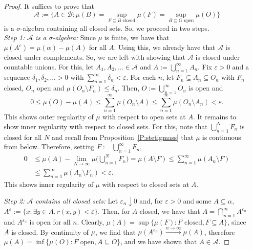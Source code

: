 \documentclass[lean]{DraftAFM}
\begin{document}
\begin{proof}
  It suffices to prove that
  $$ \mathcal A := \Big\{A \in \mathcal B : \mu(B) = \sup_{F\subseteq
    B \text{ closed}} \mu(F) = \sup_{B\subseteq O \text{ open}}
  \mu(O)\Big\} $$ is a $\sigma$-algebra containing all closed
  sets. So, we proceed in two steps.  \\ {\em Step 1: $\mathcal A$ is
    a $\sigma$-algebra:} Since $\mu$ is finite, we have that $\mu(A^c)
  = \mu(\alpha) - \mu(A)$ for all $A$. Using this, we already have
  that $\mathcal A$ is closed under complements. So, we are left with
  showing that $\mathcal A$ is closed under countable unions. For
  this, let $A_1, A_2,... \in \mathcal A$ and $A :=
  \bigcup_{n=1}^\infty A_n$. Fix $\varepsilon > 0$ and a sequence
  $\delta_1, \delta_2,... > 0$ with $\sum_{n=1}^\infty \delta_n <
  \varepsilon$. For each $n$, let $F_n \subseteq A_n \subseteq O_n$
  with $F_n$ closed, $O_n$ open and $\mu(O_n \setminus F_n) \leq
  \delta_n$. Then, $O := \bigcup_{n=1}^\infty O_n$ is open and
  $$ 0 \leq \mu(O) - \mu(A) \leq \sum_{n=1}^\infty \mu(O_n \setminus
  A) \leq \sum_{n=1}^\infty \mu(O_n \setminus A_n) < \varepsilon.$$
  This shows outer regularity of $\mu$ with respect to open sets at
  $A$. It remains to show inner regularity with respect to closed
  sets. For this, note that $\bigcup_{n=1}^N F_n$ is closed for all
  $N$ and recall from Proposition~\ref{P:stetigmass} that $\mu$ is
  continuous from below. Therefore, setting $F := \bigcup_{n=1}^\infty
  F_n$,
  \begin{align*}
    0 & \leq \mu(A) - \lim_{N\to\infty} \mu\Big(\bigcup_{n=1}^N
    F_n\Big) = \mu(A \setminus F) \leq \sum_{n=1}^\infty \mu(A_n
    \setminus F) \\ & \leq \sum_{n=1}^\infty \mu(A_n \setminus F_n) <
    \varepsilon.
  \end{align*}
  This shows inner regularity of $\mu$ with respect to closed sets at
  $A$.


  \noindent
  {\em Step 2: $\mathcal A$ contains all closed sets:} Let
  $\varepsilon_ n\downarrow 0$ and, for $\varepsilon>0$ and some $A
  \subseteq \alpha$, $A^\varepsilon := \{x : \exists y \in A,
  r(x,y)<\varepsilon\}$. Then, for $A$ closed, we have that $A =
  \bigcap_{n=1}^\infty A^{\varepsilon_n}$ and $A^{\varepsilon_n}$ is
  open for all $n$. Clearly, $\mu(A) = \sup\{\mu(F): F\text{ closed},
  F \subseteq A\}$, since $A$ is closed. By continuity of $\mu$, we
  find that $\mu(A^{\varepsilon_n}) \xrightarrow{n\to\infty} \mu(A)$,
  therefore $\mu(A) = \inf\{\mu(O): F\text{ open}, A \subseteq O\}$,
  and we have shown that $A \in \mathcal A$.
\end{proof}
\end{document}
